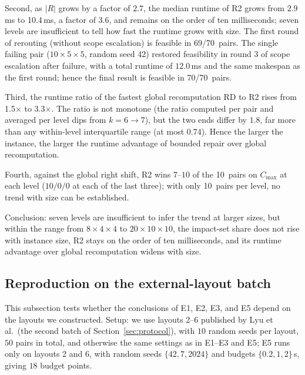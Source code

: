 \documentclass[manuscript,screen,review]{acmart}
\newcommand{\NSeeds}{10}
\newcommand{\NPubPairs}{50}
\newcommand{\ScalePairs}{70}
\newcommand{\ScaleJobsHi}{20}
\newcommand{\ScaleMachHi}{10}
\newcommand{\ScaleMsHi}{10.4}        %
\newcommand{\ScaleRatioLo}{1.5}      %
\newcommand{\ScaleRatioHi}{3.3}      %
\newcommand{\ScaleFeasFirst}{69/\ScalePairs}   %
\newcommand{\ScaleFeasAll}{\ScalePairs/\ScalePairs}
\begin{document}
Second, as \(|R|\) grows by a factor of \(2.7\), the median runtime of R2 grows from \(2.9\)\,ms to \ScaleMsHi\,ms, a factor of \(3.6\),
and remains on the order of ten milliseconds; seven levels are insufficient to tell how fast the runtime grows with size. The first round of rerouting (without scope escalation) is feasible in \ScaleFeasFirst\ pairs.
The single failing pair (\(10\times5\times5\), random seed \(42\)) restored feasibility in round \(3\) of scope escalation after failure,
with a total runtime of \(12.0\)\,ms and the same makespan as the first round; hence the final result is feasible in \ScaleFeasAll\ pairs.

Third, the runtime ratio of the fastest global recomputation RD to R2 rises from \ScaleRatioLo\(\times\) to \ScaleRatioHi\(\times\).
The ratio is not monotone (the ratio computed per pair and averaged per level dips from \(k=6\to 7\)), but the two ends differ by \(1.8\),
far more than any within-level interquartile range (at most \(0.74\)). Hence the larger the instance, the larger the runtime advantage of bounded repair over global recomputation.

Fourth, against the global right shift, R2 wins \(7\)--\(10\) of the \NSeeds\ pairs on \(C_{\max}\) at each level (\(10/0/0\) at each of the last three);
with only \NSeeds\ pairs per level, no trend with size can be established.

Conclusion: seven levels are insufficient to infer the trend at larger sizes, but within the range from \(8\times4\times4\) to \(\ScaleJobsHi\times\ScaleMachHi\times\ScaleMachHi\),
the impact-set share does not rise with instance size, R2 stays on the order of ten milliseconds, and its runtime advantage over global recomputation widens with size.

\subsection{Reproduction on the external-layout batch}
\label{sec:pubrepro}

This subsection tests whether the conclusions of E1, E2, E3, and E5 depend on the layouts we constructed. Setup: we use layouts 2--6 published by Lyu et al.\
(the second batch of Section~\ref{sec:protocol}), with \(\NSeeds\) random seeds per layout, \(\NPubPairs\) pairs in total,
and otherwise the same settings as in E1--E3 and E5; E5 runs only on layouts 2 and 6, with random seeds \(\{42,7,2024\}\)
and budgets \(\{0.2,1,2\}\)\,s, giving \(18\) budget points.
\end{document}
